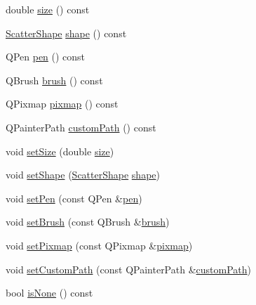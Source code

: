 \begin{DoxyCompactItemize}
\item 
double \hyperlink{class_q_c_p_scatter_style_a1973ee650368f1c5f55507b78473f634}{size} () const 
\item 
\hyperlink{class_q_c_p_scatter_style_adb31525af6b680e6f1b7472e43859349}{Scatter\-Shape} \hyperlink{class_q_c_p_scatter_style_a4462a25ef17769631f4e0aa81dadca4b}{shape} () const 
\item 
Q\-Pen \hyperlink{class_q_c_p_scatter_style_a3c24c3bf37b561b4807aed9f1418ab58}{pen} () const 
\item 
Q\-Brush \hyperlink{class_q_c_p_scatter_style_a46bf481d84bfa31b287dd43a3bf86d37}{brush} () const 
\item 
Q\-Pixmap \hyperlink{class_q_c_p_scatter_style_a9bab44cc41fcd585621a4b3e0e48231b}{pixmap} () const 
\item 
Q\-Painter\-Path \hyperlink{class_q_c_p_scatter_style_a4dd4998dfb0d6889205668a06c790328}{custom\-Path} () const 
\item 
void \hyperlink{class_q_c_p_scatter_style_aaefdd031052892c4136129db68596e0f}{set\-Size} (double \hyperlink{class_q_c_p_scatter_style_a1973ee650368f1c5f55507b78473f634}{size})
\item 
void \hyperlink{class_q_c_p_scatter_style_a7c641c4d4c6d29cb705d3887cfce91c1}{set\-Shape} (\hyperlink{class_q_c_p_scatter_style_adb31525af6b680e6f1b7472e43859349}{Scatter\-Shape} \hyperlink{class_q_c_p_scatter_style_a4462a25ef17769631f4e0aa81dadca4b}{shape})
\item 
void \hyperlink{class_q_c_p_scatter_style_a761f1f229cc0ca4703e1e2b89f6dd1ba}{set\-Pen} (const Q\-Pen \&\hyperlink{class_q_c_p_scatter_style_a3c24c3bf37b561b4807aed9f1418ab58}{pen})
\item 
void \hyperlink{class_q_c_p_scatter_style_a74d692aaeb8d4b36d6f7d510e44264b1}{set\-Brush} (const Q\-Brush \&\hyperlink{class_q_c_p_scatter_style_a46bf481d84bfa31b287dd43a3bf86d37}{brush})
\item 
void \hyperlink{class_q_c_p_scatter_style_a5fb611d46acfac520d7b89a1c71d9246}{set\-Pixmap} (const Q\-Pixmap \&\hyperlink{class_q_c_p_scatter_style_a9bab44cc41fcd585621a4b3e0e48231b}{pixmap})
\item 
void \hyperlink{class_q_c_p_scatter_style_a96a3e949f90b2afe5677ca9412a12a1e}{set\-Custom\-Path} (const Q\-Painter\-Path \&\hyperlink{class_q_c_p_scatter_style_a4dd4998dfb0d6889205668a06c790328}{custom\-Path})
\item 
bool \hyperlink{class_q_c_p_scatter_style_aa3861281108d0adbeb291c820ea3925c}{is\-None} () const 
\item 

\end{DoxyCompactItemize}
